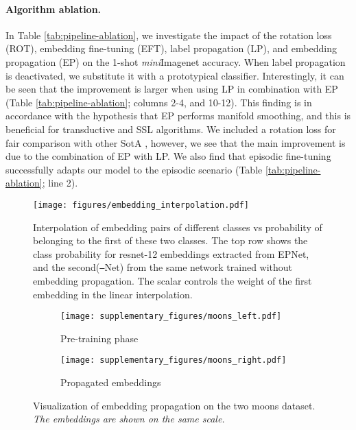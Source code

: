 \documentclass[runningheads]{llncs}
\begin{document}
\paragraph{Algorithm ablation.}  In Table \ref{tab:pipeline-ablation}, we investigate the impact of the rotation loss (ROT), embedding fine-tuning (EFT), label propagation (LP), and embedding propagation (EP) on the 1-shot \textit{mini}Imagenet accuracy. When label propagation is deactivated, we substitute it with a prototypical classifier. Interestingly, it can be seen that the improvement is larger when using LP in combination with EP (Table \ref{tab:pipeline-ablation}; columns 2-4, and 10-12). This finding is in accordance with the hypothesis that EP performs manifold smoothing, and this is beneficial for transductive and SSL algorithms. We included a rotation loss for fair comparison with other SotA \cite{gidaris2019boosting,mangla2019charting}, however, we see that the main improvement is due to the combination of EP with LP. We also find that episodic fine-tuning successfully adapts our model to the episodic scenario (Table \ref{tab:pipeline-ablation}; line 2). 

\begin{figure}[t!]
    \centering
    \texttt{[image: figures/embedding\_interpolation.pdf]}
    \caption{Interpolation of embedding pairs of different classes vs probability of belonging to the first of these two classes. The top row shows the class probability for resnet-12 embeddings extracted from EPNet, and the second(\texttt{--}Net) from the same network trained without embedding propagation. The scalar  controls the weight of the first embedding in the linear interpolation.}
     \label{fig:interpolation}
\end{figure}

\begin{figure}[t!]
    \centering
    \begin{subfigure}{0.45\textwidth}
    \centering
    \texttt{[image: supplementary\_figures/moons\_left.pdf]}
    \caption{Pre-training phase} \end{subfigure}
    \begin{subfigure}{0.45\textwidth}
    \centering
    \texttt{[image: supplementary\_figures/moons\_right.pdf]}
    \caption{Propagated embeddings} \end{subfigure}    
    \caption{Visualization of embedding propagation on the two moons dataset. \textit{The embeddings are shown on the same scale.}}
    \label{fig:my_label}
\end{figure}
\end{document}
